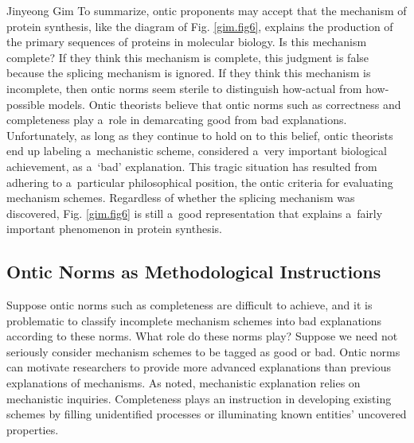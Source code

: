 \begin{artengenv}{Jinyeong Gim}
To summarize, ontic proponents may accept that the mechanism of protein synthesis, like the diagram of Fig. \ref{gim.fig6}, explains the production of the primary sequences of proteins in molecular biology. Is this mechanism complete? If they think this mechanism is complete, this judgment is false because the splicing mechanism is ignored. If they think this mechanism is incomplete, then ontic norms seem sterile to distinguish how-actual from how-possible models. Ontic theorists believe that ontic norms such as correctness and completeness play a~role in demarcating good from bad explanations. Unfortunately, as long as they continue to hold on to this belief, ontic theorists end up labeling a~mechanistic scheme, considered a~very important biological achievement, as a~‘bad' explanation. This tragic situation has resulted from adhering to a~particular philosophical position, the ontic criteria for evaluating mechanism schemes. Regardless of whether the splicing mechanism was discovered, Fig. \ref{gim.fig6} is still a~good representation that explains a~fairly important phenomenon in protein synthesis.

\subsection{Ontic Norms as Methodological Instructions }

Suppose ontic norms such as completeness are difficult to achieve, and it is problematic to classify incomplete mechanism schemes into bad explanations according to these norms. What role do these norms play? Suppose we need not seriously consider mechanism schemes to be tagged as good or bad. Ontic norms can motivate researchers to provide more advanced explanations than previous explanations of mechanisms. As noted, mechanistic explanation relies on mechanistic inquiries. Completeness plays an instruction in developing existing schemes by filling unidentified processes or illuminating known entities' uncovered properties.


\end{artengenv}
